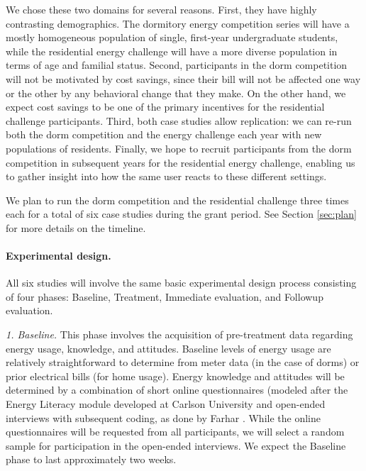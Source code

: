 We chose these two domains for several reasons. First, they have highly
contrasting demographics.  The dormitory energy competition series will
have a mostly homogeneous population of single, first-year undergraduate
students, while the residential energy challenge will have a more diverse
population in terms of age and familial status.  Second, participants in
the dorm competition will not be motivated by cost savings, since their
bill will not be affected one way or the other by any behavioral change
that they make. On the other hand, we expect cost savings to be one of the
primary incentives for the residential challenge participants.  Third, both
case studies allow replication: we can re-run both the dorm competition and
the energy challenge each year with new populations of residents.  Finally,
we hope to recruit participants from the dorm competition in subsequent
years for the residential energy challenge, enabling us to gather insight
into how the same user reacts to these different settings.

We plan to run the dorm competition and the residential challenge three
times each for a total of six case studies during the grant period.  See
Section \ref{sec:plan} for more details on the timeline.

\paragraph{Experimental design.}

All six studies will involve the same basic experimental design process
consisting of four phases: Baseline, Treatment, Immediate evaluation, and
Followup evaluation.

{\em 1. Baseline.}  This phase involves the acquisition of
pre-treatment data regarding energy usage, knowledge, and attitudes.
Baseline levels of energy usage are relatively straightforward to determine
from meter data (in the case of dorms) or prior electrical bills (for home
usage).  Energy knowledge and attitudes will be determined by a combination
of short online questionnaires (modeled after the Energy Literacy module
developed at Carlson University \cite{DeWaters09,DeWaters09b} and
open-ended interviews with subsequent coding, as done by Farhar
\cite{Farhar09}. While the online questionnaires will be requested from all
participants, we will select a random sample for participation in the
open-ended interviews.  We expect the Baseline phase to last approximately
two weeks. 

